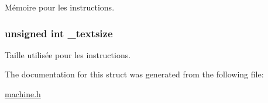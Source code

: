 \-Mémoire pour les instructions. 

\hypertarget{struct_machine_ac0943af89706f023b8f3c9c75e2c9f16}{
\subsubsection[{\-\_\-textsize}]{\setlength{\rightskip}{0pt plus 5cm}unsigned int {\bf \-\_\-textsize}}}\label{struct_machine_ac0943af89706f023b8f3c9c75e2c9f16}


\-Taille utilisée pour les instructions. 



\-The documentation for this struct was generated from the following file\-:\begin{DoxyCompactItemize}
\item 
\hyperlink{machine_8h}{machine.\-h}\end{DoxyCompactItemize}
